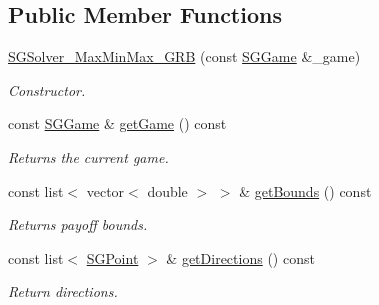 \subsection*{Public Member Functions}
\begin{DoxyCompactItemize}
\item 
\mbox{\label{classSGSolver__MaxMinMax__GRB_a93a0fb79cacc98677c690ef5cc7ee957}} 
\hyperlink{classSGSolver__MaxMinMax__GRB_a93a0fb79cacc98677c690ef5cc7ee957}{S\+G\+Solver\+\_\+\+Max\+Min\+Max\+\_\+\+G\+RB} (const \hyperlink{classSGGame}{S\+G\+Game} \&\+\_\+game)
\begin{DoxyCompactList}\small\item\em Constructor. \end{DoxyCompactList}\item 
\mbox{\label{classSGSolver__MaxMinMax__GRB_aa63bb9271d140074068867bf7d0bd324}} 
const \hyperlink{classSGGame}{S\+G\+Game} \& \hyperlink{classSGSolver__MaxMinMax__GRB_aa63bb9271d140074068867bf7d0bd324}{get\+Game} () const
\begin{DoxyCompactList}\small\item\em Returns the current game. \end{DoxyCompactList}\item 
\mbox{\label{classSGSolver__MaxMinMax__GRB_afa3a335debfcb367a46674bb3603af3b}} 
const list$<$ vector$<$ double $>$ $>$ \& \hyperlink{classSGSolver__MaxMinMax__GRB_afa3a335debfcb367a46674bb3603af3b}{get\+Bounds} () const
\begin{DoxyCompactList}\small\item\em Returns payoff bounds. \end{DoxyCompactList}\item 
\mbox{\label{classSGSolver__MaxMinMax__GRB_a2b6afce012cf78c940598572c70fc267}} 
const list$<$ \hyperlink{classSGPoint}{S\+G\+Point} $>$ \& \hyperlink{classSGSolver__MaxMinMax__GRB_a2b6afce012cf78c940598572c70fc267}{get\+Directions} () const
\begin{DoxyCompactList}\small\item\em Return directions. \end{DoxyCompactList}\item 
\mbox{\label{classSGSolver__MaxMinMax__GRB_a2d430095d9f4eed1f776fcff2f28b2f6}} 

\end{DoxyCompactItemize}
